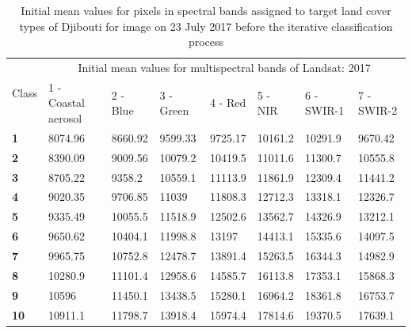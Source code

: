 \documentclass[jimaging,article,submit,pdftex,moreauthors]{Definitions/mdpi}
\begin{document}
\begin{table}[H]
  \centering
  \begin{tabularx}{\textwidth}{p{0.7cm}p{2.5cm}p{1.0cm}p{1.3cm}p{1.0cm}p{1.0cm}p{1.5cm}p{1.5cm}}
  \toprule
  \multirow{2}{*}{Class} & \multicolumn{7}{c}{Initial mean values for multispectral bands of Landsat:  2017} \\
     & 1 - Coastal aerosol & 2 - Blue & 3 - Green & 4 - Red & 5 - NIR & 6 - SWIR-1 & 7 - SWIR-2 \\
    \midrule
    \textbf{1} & 8074.96 & 8660.92 & 9599.33 & 9725.17 & 10161.2 & 10291.9 & 9670.42 \\
    \textbf{2} & 8390.09 & 9009.56 & 10079.2 & 10419.5 & 11011.6 & 11300.7 & 10555.8 \\
    \textbf{3} & 8705.22 & 9358.2 & 10559.1 & 11113.9 & 11861.9 & 12309.4 & 11441.2 \\
    \textbf{4} & 9020.35 & 9706.85 & 11039 & 11808.3 & 12712.3 & 13318.1 & 12326.7 \\
    \textbf{5} & 9335.49 & 10055.5 & 11518.9 & 12502.6 & 13562.7 & 14326.9 & 13212.1 \\
    \textbf{6} & 9650.62 & 10404.1 & 11998.8 & 13197 & 14413.1 & 15335.6 & 14097.5 \\
    \textbf{7} & 9965.75 &10752.8 & 12478.7 &13891.4 & 15263.5 & 16344.3 & 14982.9 \\
    \textbf{8} & 10280.9 & 11101.4 & 12958.6 & 14585.7 & 16113.8 & 17353.1 & 15868.3 \\
    \textbf{9} & 10596 &11450.1 & 13438.5 & 15280.1 & 16964.2 & 18361.8 & 16753.7 \\
    \textbf{10} & 10911.1 & 11798.7 & 13918.4 & 15974.4 & 17814.6 & 19370.5 & 17639.1 \\
\bottomrule
\end{tabularx}
  \caption{Initial mean values for pixels in spectral bands assigned to target land cover types of Djibouti for image on 23 July 2017 before the iterative classification process}
  \label{tabA2} 
\end{table} 
\end{document}
